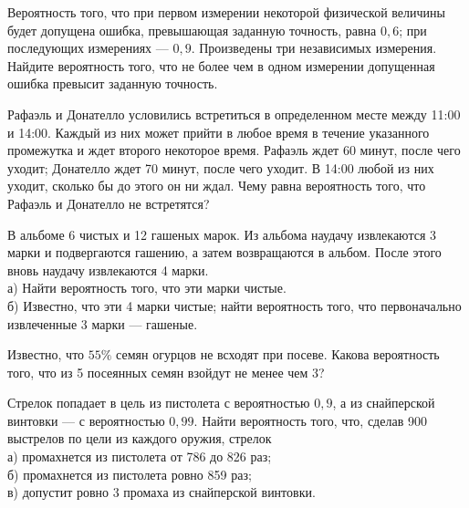 \newpage\setcounter{zad}{0}



\begin{zkrW}{20}\noindent 
	Вероятность того, что при первом измерении некоторой физической величины будет допущена ошибка, превышающая заданную точность, равна $0{,}6$; при последующих измерениях --- $0{,}9$. Произведены три независимых измерения. Найдите вероятность того, что не более чем в одном измерении допущенная ошибка превысит заданную точность.
 
\end{zkrW}

\begin{zkrW}{20}\noindent 
	Рафаэль и Донателло условились встретиться в определенном месте между 11:00 и 14:00. Каждый из них может прийти в любое время в течение указанного промежутка и ждет второго некоторое время. Рафаэль ждет 60 минут, после чего уходит; Донателло ждет 70 минут, после чего уходит. В 14:00 любой из них уходит, сколько бы до этого он ни ждал. Чему равна вероятность того, что Рафаэль и Донателло не встретятся?
 
\end{zkrW}

\begin{zkrW}{20}\noindent 
	В альбоме 6 чистых и 12 гашеных марок. Из альбома наудачу извлекаются 3 марки и подвергаются гашению, а затем возвращаются в альбом. После этого вновь наудачу извлекаются 4 марки. \\ \indent а) Найти вероятность того, что эти марки чистые. \\ \indent б) Известно, что эти 4 марки чистые; найти вероятность того, что первоначально извлеченные 3 марки --- гашеные.
 
\end{zkrW}

\begin{zkrW}{20}\noindent 
	Известно, что $55\%$ семян огурцов не всходят при посеве. Какова вероятность того, что из 5 посеянных семян взойдут не менее чем 3?
 
\end{zkrW}

\begin{zkrW}{20}\noindent 
	Стрелок попадает в цель из пистолета с вероятностью $0{,}9$, а из снайперской винтовки --- с вероятностью $0{,}99$. Найти вероятность того, что, сделав 900 выстрелов по цели из каждого оружия, стрелок \\ \indent а) промахнется из пистолета от 786 до 826 раз; \\ \indent б) промахнется из пистолета ровно 859 раз; \\ \indent в) допустит ровно 3 промаха из снайперской винтовки.
 
\end{zkrW}

